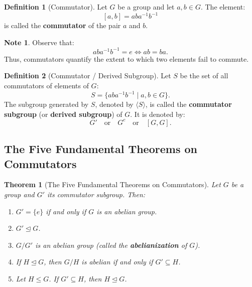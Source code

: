 \documentclass[12pt]{article}
\theoremstyle{definition}
\newtheorem{definition}{Definition}[section]
\newtheorem*{note}{Note}
\theoremstyle{plain}
\newtheorem{theorem}{Theorem}[section]
\begin{document}
\begin{definition}[Commutator]
Let $G$ be a group and let $a, b \in G$. The element:
\[
[a, b] = a b a^{-1} b^{-1}
\]
is called the \textbf{commutator} of the pair $a$ and $b$.
\end{definition}

\begin{note}
Observe that:
\[
a b a^{-1} b^{-1} = e \iff a b = b a.
\]
Thus, commutators quantify the extent to which two elements fail to commute.
\end{note}

\begin{definition}[Commutator / Derived Subgroup]
Let $S$ be the set of all commutators of elements of $G$:
\[
S = \{ a b a^{-1} b^{-1} \mid a, b \in G \}.
\]
The subgroup generated by $S$, denoted by $\langle S \rangle$, is called the \textbf{commutator subgroup} (or \textbf{derived subgroup}) of $G$.
It is denoted by:
\[
G' \quad \text{or} \quad G^c \quad \text{or} \quad [G, G].
\]
\end{definition}

\subsection{The Five Fundamental Theorems on Commutators}

\begin{theorem}[The Five Fundamental Theorems on Commutators]
Let $G$ be a group and $G'$ its commutator subgroup. Then:
\begin{enumerate}
    \item $G' = \{e\}$ if and only if $G$ is an abelian group.
    \item $G' \trianglelefteq G$.
    \item $G/G'$ is an abelian group (called the \textbf{abelianization} of $G$).
    \item If $H \trianglelefteq G$, then $G/H$ is abelian if and only if $G' \subseteq H$.
    \item Let $H \le G$. If $G' \subseteq H$, then $H \trianglelefteq G$.
\end{enumerate}
\end{theorem}
\end{document}
